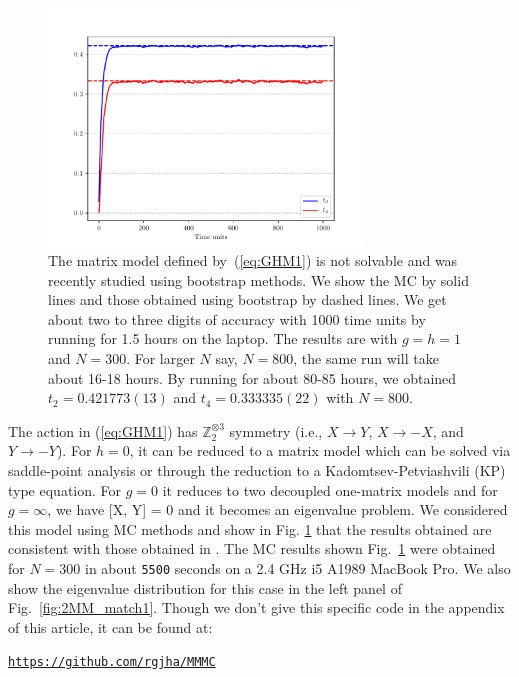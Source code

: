 \documentclass[11pt]{article}
\begin{document}
\begin{figure}[htbp] 
	\centering 
	\includegraphics[width=0.75\textwidth]{figs/plot_2MM_sym1.pdf}
	\caption{\label{fig:2MM_match}The matrix model defined by~(\ref{eq:GHM1}) is not solvable and was 
recently studied using bootstrap methods. We show the MC by solid lines and those 
obtained using bootstrap by dashed lines. We get about two to three digits of accuracy with 1000 time units 
by running for 1.5 hours on the laptop. The results are with $g=h=1$ and $N=300$. For larger $N$ say, $N=800$, 
the same run will take about 16-18 hours. By running for about 80-85 hours, we obtained 
$t_{2} = 0.421773(13) $ and $t_{4}=0.333335(22)$ with $N=800$.}
\end{figure} 

The action in (\ref{eq:GHM1}) has $\mathbb{Z}_{2}^{\otimes 3}$ symmetry 
(i.e., $X \to Y$, $X \to -X$, and $Y \to -Y$). For $h = 0$, it can be reduced to a
matrix model which can be solved via saddle-point analysis or through the reduction 
to a Kadomtsev-Petviashvili (KP) type equation. 
For $g = 0$ it reduces to two decoupled one-matrix models 
and for $g = \infty$, we have [X, Y] = 0 and it becomes an eigenvalue problem. 
We considered this model using MC methods and show in Fig. \ref{fig:2MM_match} that the results 
obtained are consistent with those obtained in \cite{Kazakov:2021lel}. 
The MC results shown Fig.~\ref{fig:2MM_match} 
were obtained for $N = 300$ in about \texttt{5500} seconds on a 2.4 GHz i5 A1989 MacBook Pro. 
We also show the eigenvalue distribution for this case in the left panel of Fig.~\ref{fig:2MM_match1}. 
Though we don't give this specific code in the appendix of this article, it can be found at: 
\begin{center} \texttt{\href{https://github.com/rgjha/MMMC}{https://github.com/rgjha/MMMC}} \end{center}
\end{document}
